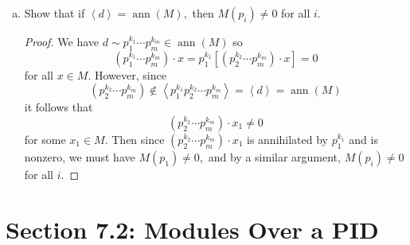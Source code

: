 \documentclass{article}
\DeclareMathOperator{\ann}{ann}
\begin{document}
\begin{enumerate}
\begin{enumerate}[(a)]
			\item Show that if $\left< d\right>=\ann(M),$ then $M(p_i)\neq 0$ for all $i.$
				\begin{proof}
					We have $d\sim p_1^{k_1}\cdots p_m^{k_m}\in\ann(M)$ so
					\[(p_1^{k_1}\cdots p_m^{k_m})\cdot x = p_1^{k_1}\left[ (p_2^{k_2}\cdots p_m^{k_m})\cdot x \right] = 0\]
					for all $x\in M.$ However, since
					\[(p_2^{k_2}\cdots p_m^{k_m})\notin \left< p_1^{k_1}p_2^{k_2}\cdots p_m^{k_m}\right> = \left< d\right> = \ann(M)\]
					it follows that
					\[(p_2^{k_2}\cdots p_m^{k_m})\cdot x_1\neq 0\]
					for some $x_1\in M.$ Then since $(p_2^{k_2}\cdots p_m^{k_m})\cdot x_1$ is annihilated by $p_1^{k_1}$ and is nonzero, we must have $M(p_1)\neq 0,$ and by a similar argument, $M(p_i)\neq 0$ for all $i.$
				\end{proof}
				
		\end{enumerate}

\end{enumerate}

\section*{Section 7.2: Modules Over a PID}
\end{document}
